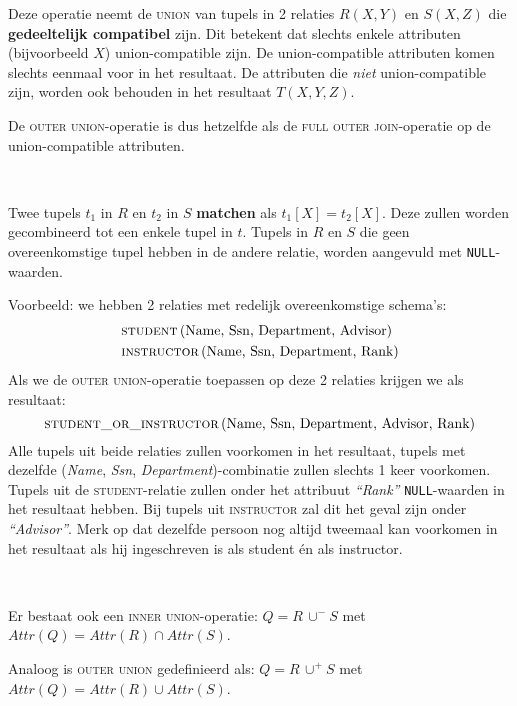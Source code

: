 Deze operatie neemt de \textsc{union} van tupels in 2 relaties $R(X,Y)$ en $S(X,Z)$ die \textbf{gedeeltelijk compatibel} zijn. Dit betekent dat slechts enkele attributen (bijvoorbeeld $X$) union-compatible zijn. De union-compatible attributen komen slechts eenmaal voor in het resultaat. De  attributen die \textit{niet} union-compatible zijn, worden ook behouden in het resultaat $T(X,Y,Z)$.

De \textsc{outer union}-operatie is dus hetzelfde als de \textsc{full outer join}-operatie op de union-compatible attributen.

~

\noindent Twee tupels $t_1$ in $R$ en $t_2$ in $S$ \textbf{matchen} als $t_1[X]=t_2[X]$. Deze zullen worden gecombineerd tot een enkele tupel in $t$. Tupels in $R$ en $S$ die geen overeenkomstige tupel hebben in de andere relatie, worden aangevuld met \texttt{NULL}-waarden.

\newpage
\noindent Voorbeeld: we hebben 2 relaties met redelijk overeenkomstige schema's:
\vspace{-2mm}
\begin{align*}
& \textsc{student} \,(\text{Name, Ssn, Department, Advisor}) \\
& \textsc{instructor} \,(\text{Name, Ssn, Department, Rank})
\end{align*}
Als we de \textsc{outer union}-operatie toepassen op deze 2 relaties krijgen we als resultaat:
\vspace{-2mm}
\[ \textsc{student\_or\_instructor} \,(\text{Name, Ssn, Department, Advisor, Rank}) \]
Alle tupels uit beide relaties zullen voorkomen in het resultaat, tupels met dezelfde (\textit{Name}, \textit{Ssn}, \textit{Department})-combinatie zullen slechts 1 keer voorkomen. Tupels uit de \textsc{student}-relatie zullen onder het attribuut \textit{``Rank''} \texttt{NULL}-waarden in het resultaat hebben. Bij tupels uit \textsc{instructor} zal dit het geval zijn onder \textit{``Advisor''}. Merk op dat dezelfde persoon nog altijd tweemaal kan voorkomen in het resultaat als hij ingeschreven is als student \'en als instructor.

~

\noindent Er bestaat ook een \textsc{inner union}-operatie: $Q = R \,\cup^- S$ met $\textit{Attr}(Q) = \textit{Attr}(R) \cap \textit{Attr}(S)$.

Analoog is \textsc{outer union} gedefinieerd als: $Q = R \,\cup^+ S$ met $\textit{Attr}(Q) = \textit{Attr}(R) \cup \textit{Attr}(S)$.


\setcounter{section}{5}
